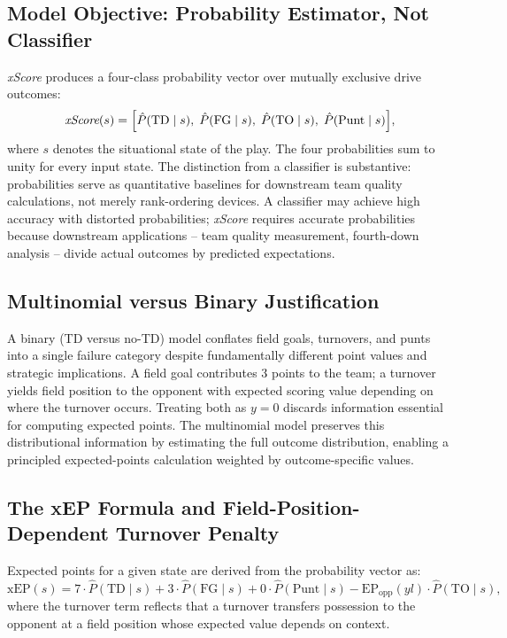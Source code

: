 \documentclass[12pt,a4paper]{article}
\newcommand{\xscore}{\textit{xScore}}
\begin{document}
\subsection{Model Objective: Probability Estimator, Not Classifier}

\xscore{} produces a four-class probability vector over mutually exclusive drive outcomes:
\begin{equation}
  \xscore(s) = \Bigl[\hat{P}(\text{TD} \mid s),\;
                      \hat{P}(\text{FG} \mid s),\;
                      \hat{P}(\text{TO} \mid s),\;
                      \hat{P}(\text{Punt} \mid s)\Bigr],
\end{equation}
where $s$ denotes the situational state of the play. The four probabilities sum to unity for every input state. The distinction from a classifier is substantive: probabilities serve as quantitative baselines for downstream team quality calculations, not merely rank-ordering devices. A classifier may achieve high accuracy with distorted probabilities; \xscore{} requires accurate probabilities because downstream applications -- team quality measurement, fourth-down analysis -- divide actual outcomes by predicted expectations.

\subsection{Multinomial versus Binary Justification}

A binary (TD versus no-TD) model conflates field goals, turnovers, and punts into a single failure category despite fundamentally different point values and strategic implications. A field goal contributes 3 points to the team; a turnover yields field position to the opponent with expected scoring value depending on where the turnover occurs. Treating both as $y = 0$ discards information essential for computing expected points. The multinomial model preserves this distributional information by estimating the full outcome distribution, enabling a principled expected-points calculation weighted by outcome-specific values.

\subsection{The xEP Formula and Field-Position-Dependent Turnover Penalty}

Expected points for a given state are derived from the probability vector as:
\begin{equation}
  \label{eq:xep}
  \text{xEP}(s) = 7 \cdot \hat{P}(\text{TD} \mid s)
                 + 3 \cdot \hat{P}(\text{FG} \mid s)
                 + 0 \cdot \hat{P}(\text{Punt} \mid s)
                 - \text{EP}_{\text{opp}}(yl) \cdot \hat{P}(\text{TO} \mid s),
\end{equation}
where the turnover term reflects that a turnover transfers possession to the opponent at a field position whose expected value depends on context.
\end{document}

